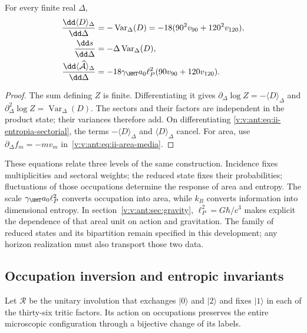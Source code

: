 \begin{proposition}
For every finite real $\Delta$,
\begin{align}
 \frac{\dd\langle D\rangle_\Delta}{\dd\Delta}
 &=-\operatorname{Var}_\Delta(D)
   =-18(90^2v_{90}+120^2v_{120}),\\
 \frac{\dd s}{\dd\Delta}
 &=-\Delta\operatorname{Var}_\Delta(D),
 \label{v:v:ant:eq:ii-respuesta-entropica}\\
 \frac{\dd\langle\widehat{\mathcal A}\rangle_\Delta}{\dd\Delta}
 &=-18\gamma_{\HMT}a_0\ell_P^2(90v_{90}+120v_{120}).
 \label{v:v:ant:eq:ii-respuesta-areal}
\end{align}
\end{proposition}
\begin{proof}
The sum defining $Z$ is finite. Differentiating it gives
$\partial_\Delta\log Z=-\langle D\rangle_\Delta$ and
$\partial_\Delta^2\log Z=\operatorname{Var}_\Delta(D)$.
The sectors and their factors are independent in the product state;
their variances therefore add. On differentiating
\eqref{v:v:ant:eq:ii-entropia-sectorial}, the terms
$-\langle D\rangle_\Delta$ and $\langle D\rangle_\Delta$
cancel. For area, use
$\partial_\Delta f_m=-mv_m$ in~\eqref{v:v:ant:eq:ii-area-media}.
\end{proof}

These equations relate three levels of the same construction.
Incidence fixes multiplicities and sectoral weights; the
reduced state fixes their probabilities; fluctuations of those
occupations determine the response of area and entropy.
The scale $\gamma_{\HMT}a_0\ell_P^2$ converts occupation into area,
while $k_B$ converts information into dimensional entropy.
In section~\ref{v:v:ant:sec:gravity}, $\ell_P^2=G\hbar/c^3$ makes explicit
the dependence of that areal unit on action and gravitation.
The family of reduced states and its bipartition remain specified
in this development; any horizon realization must also transport
those two data.

\subsection{Occupation inversion and entropic invariants}
\label{v:v:ant:sec:ii-inversion-sectorial}

Let $\mathcal R$ be the unitary involution that exchanges $|0\rangle$
and $|2\rangle$ and fixes $|1\rangle$ in each of the thirty-six
tritic factors. Its action on occupations preserves the entire
microscopic configuration through a bijective change of its labels.

